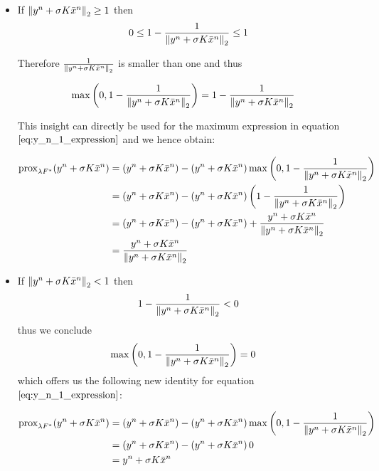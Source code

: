\begin{itemize}
	\item If $\left\lVert y^n + \sigma K \bar{x}^{n}\right\rVert_2 \geq 1$
		then  
		\begin{align}
			0 \leq 1-\frac{1}{\left\lVert y^n + \sigma K \bar{x}^{n}\right\rVert_2} \leq 1
		\end{align}
		
		Therefore $\frac{1}{\left\lVert y^n + \sigma K \bar{x}^{n}\right\rVert_2}$ is smaller than one and thus
		
		\begin{align}
			\max{\left(0, 1-\frac{1}{\left\lVert y^n + \sigma K \bar{x}^{n}\right\rVert_2}\right)} 
			&= 1-\frac{1}{\left\lVert y^n + \sigma K \bar{x}^{n}\right\rVert_2}
		\end{align}
		
		This insight can directly be used for the maximum expression in equation $\ref{eq:y_n_1_expression}$ and we hence obtain:
		
		\begin{align}
			\text{prox}_{\lambda F^*}(y^n + \sigma K \bar{x}^{n})
			&= (y^n + \sigma K \bar{x}^{n}) - \left( y^n + \sigma K \bar{x}^{n} \right) \max{\left(0, 1-\frac{1}{\left\lVert y^n + \sigma K \bar{x}^{n} \right\rVert_2}\right)} \nonumber \\
			&= (y^n + \sigma K \bar{x}^{n}) - \left( y^n + \sigma K \bar{x}^{n} \right) \left( 1-\frac{1}{\left\lVert y^n + \sigma K \bar{x}^{n}\right\rVert_2} \right)\nonumber \\
			&= (y^n + \sigma K \bar{x}^{n}) -(y^n + \sigma K \bar{x}^{n}) +\frac{y^n + \sigma K \bar{x}^{n}}{\left\lVert y^n + \sigma K \bar{x}^{n}\right\rVert_2} \nonumber \\
			&= \frac{y^n + \sigma K \bar{x}^{n}}{\left\lVert y^n + \sigma K \bar{x}^{n}\right\rVert_2}
		\end{align}
		
	\item If $\left\lVert y^n + \sigma K \bar{x}^{n}\right\rVert_2 < 1$
		then 
		\begin{align}
			1-\frac{1}{\left\lVert y^n + \sigma K \bar{x}^{n}\right\rVert_2} < 0
		\end{align}
		thus we conclude 
		\begin{align}
			\max{\left(0, 1-\frac{1}{\left\lVert y^n + \sigma K \bar{x}^{n}\right\rVert_2}\right)} 
			&= 0
		\end{align}
		which offers us the following new identity for equation $\ref{eq:y_n_1_expression}$:
		
		\begin{align}
			\text{prox}_{\lambda F^*}(y^n + \sigma K \bar{x}^{n})
			&= (y^n + \sigma K \bar{x}^{n}) - \left( y^n + \sigma K \bar{x}^{n} \right) \max{\left(0, 1-\frac{1}{\left\lVert y^n + \sigma K \bar{x}^{n} \right\rVert_2}\right)} \nonumber \\
			&= (y^n + \sigma K \bar{x}^{n}) - \left( y^n + \sigma K \bar{x}^{n} \right) 0 \nonumber \\
			&= y^n + \sigma K \bar{x}^{n}
		\end{align}
\end{itemize}


